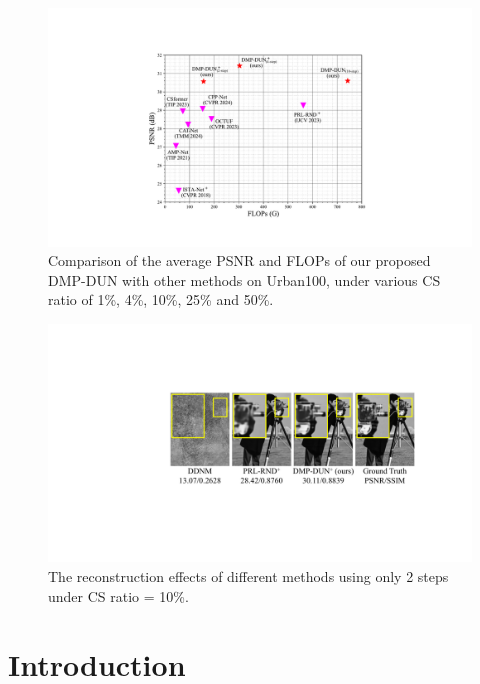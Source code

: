 \documentclass[10pt,twocolumn,letterpaper]{article}
\begin{document}
\begin{figure}[t]
	\centering
	\includegraphics[width=\linewidth]{psnr_flops_image_compare.pdf}
	\caption{Comparison of the average PSNR and FLOPs of our proposed DMP-DUN with other methods on Urban100\cite{Dong2018DenoisingPD}, under various CS ratio of 1\%, 4\%, 10\%, 25\% and 50\%.}
	\label{fig:psnr_flops_compare}
\end{figure}
\begin{figure}[t]
	\centering
	\includegraphics[width=\linewidth]{PreCompare.pdf}
	\caption{The reconstruction effects of different methods using only 2 steps under CS ratio = 10\%.}
	\label{fig:pre_compare}
\end{figure}

\section{Introduction}
{\def\thefootnote{*}}
\end{document}
